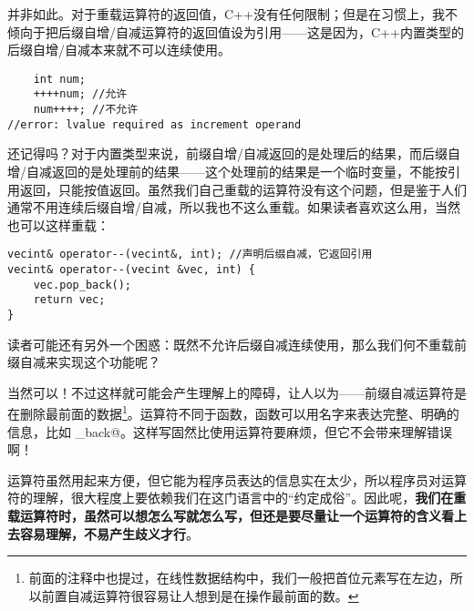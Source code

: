 并非如此。对于重载运算符的返回值，C++没有任何限制；但是在习惯上，我不倾向于把后缀自增/自减运算符的返回值设为引用——这是因为，C++内置类型的后缀自增/自减本来就不可以连续使用。
\begin{lstlisting}
    int num;
    ++++num; //允许
    num++++; //不允许
//error: lvalue required as increment operand
\end{lstlisting}\par
还记得吗？对于内置类型来说，前缀自增/自减返回的是处理后的结果，而后缀自增/自减返回的是处理前的结果——这个处理前的结果是一个临时变量，不能按引用返回，只能按值返回。虽然我们自己重载的运算符没有这个问题，但是鉴于人们通常不用连续后缀自增/自减，所以我也不这么重载。如果读者喜欢这么用，当然也可以这样重载：
\begin{lstlisting}
vecint& operator--(vecint&, int); //声明后缀自减，它返回引用
vecint& operator--(vecint &vec, int) {
    vec.pop_back();
    return vec;
}
\end{lstlisting}\par
读者可能还有另外一个困惑：既然不允许后缀自减连续使用，那么我们何不重载前缀自减来实现这个功能呢？\par
当然可以！不过这样就可能会产生理解上的障碍，让人以为——前缀自减运算符是在删除最前面的数据\footnote{前面的注释中也提过，在线性数据结构中，我们一般把首位元素写在左边，所以前置自减运算符很容易让人想到是在操作最前面的数。}。运算符不同于函数，函数可以用名字来表达完整、明确的信息，比如 \lstinline@pop_back@。这样写固然比使用运算符要麻烦，但它不会带来理解错误啊！\par
运算符虽然用起来方便，但它能为程序员表达的信息实在太少，所以程序员对运算符的理解，很大程度上要依赖我们在这门语言中的``约定成俗''。因此呢，\textbf{我们在重载运算符时，虽然可以想怎么写就怎么写，但还是要尽量让一个运算符的含义看上去容易理解，不易产生歧义才行}。\par
